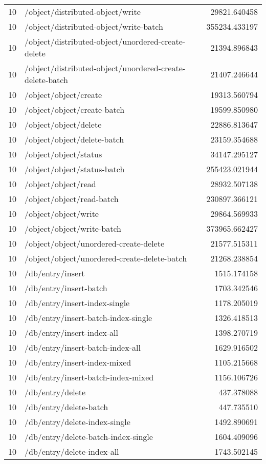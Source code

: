 \begin{longtable}{rlr}
10 & /object/distributed-object/write & 29821.640458 \\
10 & /object/distributed-object/write-batch & 355234.433197 \\
10 & /object/distributed-object/unordered-create-delete & 21394.896843 \\
10 & /object/distributed-object/unordered-create-delete-batch & 21407.246644 \\
10 & /object/object/create & 19313.560794 \\
10 & /object/object/create-batch & 19599.850980 \\
10 & /object/object/delete & 22886.813647 \\
10 & /object/object/delete-batch & 23159.354688 \\
10 & /object/object/status & 34147.295127 \\
10 & /object/object/status-batch & 255423.021944 \\
10 & /object/object/read & 28932.507138 \\
10 & /object/object/read-batch & 230897.366121 \\
10 & /object/object/write & 29864.569933 \\
10 & /object/object/write-batch & 373965.662427 \\
10 & /object/object/unordered-create-delete & 21577.515311 \\
10 & /object/object/unordered-create-delete-batch & 21268.238854 \\
10 & /db/entry/insert & 1515.174158 \\
10 & /db/entry/insert-batch & 1703.342546 \\
10 & /db/entry/insert-index-single & 1178.205019 \\
10 & /db/entry/insert-batch-index-single & 1326.418513 \\
10 & /db/entry/insert-index-all & 1398.270719 \\
10 & /db/entry/insert-batch-index-all & 1629.916502 \\
10 & /db/entry/insert-index-mixed & 1105.215668 \\
10 & /db/entry/insert-batch-index-mixed & 1156.106726 \\
10 & /db/entry/delete & 437.378088 \\
10 & /db/entry/delete-batch & 447.735510 \\
10 & /db/entry/delete-index-single & 1492.890691 \\
10 & /db/entry/delete-batch-index-single & 1604.409096 \\
10 & /db/entry/delete-index-all & 1743.502145 \\

\end{longtable}
